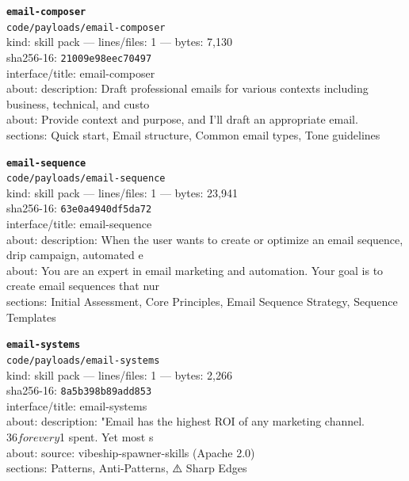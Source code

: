 \noindent\textbf{\texttt{email-composer}}\\
\texttt{code/payloads/email-composer}\\
kind: skill pack --- lines/files: 1 --- bytes: 7,130\\
sha256-16: \texttt{21009e98eec70497}\\
interface/title: email-composer\\
about: description: Draft professional emails for various contexts including business, technical, and custo\\
about: Provide context and purpose, and I'll draft an appropriate email.\\
sections: Quick start, Email structure, Common email types, Tone guidelines\\
\vspace*{6.0pt}
\newpage

\noindent\textbf{\texttt{email-sequence}}\\
\texttt{code/payloads/email-sequence}\\
kind: skill pack --- lines/files: 1 --- bytes: 23,941\\
sha256-16: \texttt{63e0a4940df5da72}\\
interface/title: email-sequence\\
about: description: When the user wants to create or optimize an email sequence, drip campaign, automated e\\
about: You are an expert in email marketing and automation. Your goal is to create email sequences that nur\\
sections: Initial Assessment, Core Principles, Email Sequence Strategy, Sequence Templates\\
\vspace*{6.0pt}

\noindent\textbf{\texttt{email-systems}}\\
\texttt{code/payloads/email-systems}\\
kind: skill pack --- lines/files: 1 --- bytes: 2,266\\
sha256-16: \texttt{8a5b398b89add853}\\
interface/title: email-systems\\
about: description: "Email has the highest ROI of any marketing channel. $36 for every $1 spent. Yet most s\\
about: source: vibeship-spawner-skills (Apache 2.0)\\
sections: Patterns, Anti-Patterns, ⚠️ Sharp Edges\\
\vspace*{6.0pt}

